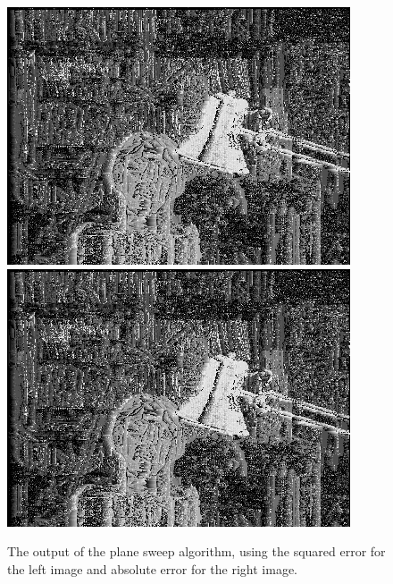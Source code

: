 \documentclass[a4paper, titlepage,12pt]{article}
\begin{document}
	\begin{figure}[H]
		\begin{center}
			\includegraphics[scale=0.5]{./out_sq_err.png}
			\includegraphics[scale=0.5]{./out_abs_err.png}
			\caption{The output of the plane sweep algorithm, using the squared error for the left image and absolute error for the right image.}
		\end{center}
	\end{figure}
\end{document}
